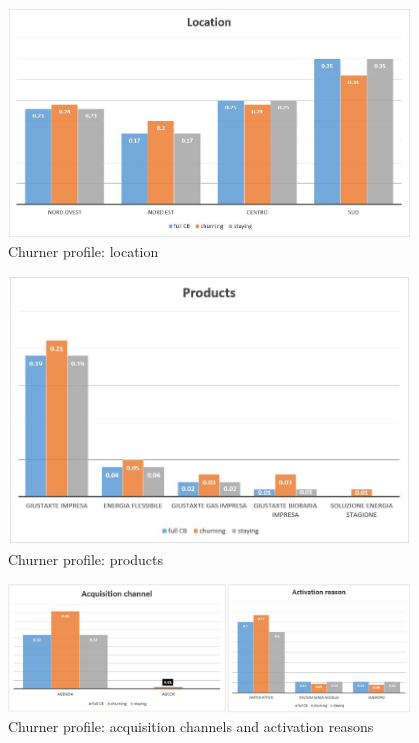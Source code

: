 \documentclass[LaM,binding=0.6cm, english]{sapthesis}
\begin{document}
\begin{figure}[!ht]
    \includegraphics[width=0.95\textwidth]{images/location.jpg}
    \centering
    \caption{Churner profile: location}
    \label{fig:location}
\end{figure}

\begin{figure}[!ht]
    \includegraphics[width=0.95\textwidth]{images/products.jpg}
    \centering
    \caption{Churner profile: products}
    \label{fig:products}
\end{figure}

\begin{figure}[!ht]
    \includegraphics[width=0.95\textwidth]{images/acquisition.jpg}
    \centering
    \caption{Churner profile: acquisition channels and activation reasons}
    \label{fig:acquisition}
\end{figure}
\end{document}
